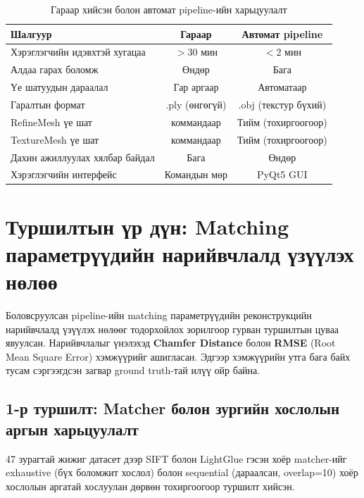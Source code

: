 \begin{table}[H]
\centering
\caption{Гараар хийсэн болон автомат pipeline-ийн харьцуулалт}
\label{tab:manual_vs_auto}
\small
\begin{tabular}{|l|c|c|}
\hline
\textbf{Шалгуур} & \textbf{Гараар} & \textbf{Автомат pipeline} \\ \hline
Хэрэглэгчийн идэвхтэй хугацаа & $>$30 мин & $<$2 мин \\ \hline
Алдаа гарах боломж & Өндөр & Бага \\ \hline
Үе шатуудын дараалал & Гар аргаар & Автоматаар \\ \hline
Гаралтын формат & .ply (өнгөгүй) & .obj (текстур бүхий) \\ \hline
RefineMesh үе шат & коммандаар & Тийм (тохиргоогоор) \\ \hline
TextureMesh үе шат & коммандаар & Тийм (тохиргоогоор) \\ \hline
Дахин ажиллуулах хялбар байдал & Бага & Өндөр \\ \hline
Хэрэглэгчийн интерфейс & Командын мөр & PyQt5 GUI \\ \hline
\end{tabular}
\end{table}

\section{Туршилтын үр дүн: Matching параметрүүдийн нарийвчлалд үзүүлэх нөлөө}

Боловсруулсан pipeline-ийн matching параметрүүдийн реконструкцийн нарийвчлалд үзүүлэх нөлөөг тодорхойлох зорилгоор гурван туршилтын цуваа явуулсан. Нарийвчлалыг үнэлэхэд \textbf{Chamfer Distance} болон \textbf{RMSE} (Root Mean Square Error) хэмжүүрийг ашигласан. Эдгээр хэмжүүрийн утга бага байх тусам сэргээгдсэн загвар ground truth-тай илүү ойр байна.

\subsection{1-р туршилт: Matcher болон зургийн хослолын аргын харьцуулалт}

47 зурагтай жижиг датасет дээр SIFT болон LightGlue гэсэн хоёр matcher-ийг exhaustive (бүх боломжит хослол) болон sequential (дараалсан, overlap=10) хоёр хослолын аргатай хослуулан дөрвөн тохиргоогоор туршилт хийсэн.

